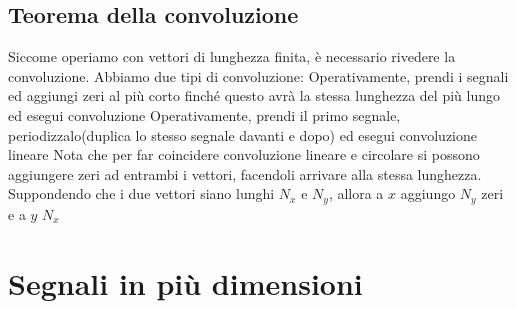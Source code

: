 \subsection{Teorema della convoluzione}
Siccome operiamo con vettori di lunghezza finita, è necessario rivedere la convoluzione. Abbiamo due tipi di convoluzione:
Operativamente, prendi i segnali ed aggiungi zeri al più corto finché questo avrà la stessa lunghezza del più lungo ed esegui convoluzione
Operativamente, prendi il primo segnale, periodizzalo(duplica lo stesso segnale davanti e dopo) ed esegui convoluzione lineare
Nota che per far coincidere convoluzione lineare e circolare si possono aggiungere zeri ad entrambi i vettori, facendoli arrivare alla stessa lunghezza.
\vskip3mm
Suppondendo che i due vettori siano lunghi $ N_x $ e $ N_y $, allora a $ x $ aggiungo $ N_y $ zeri e a $ y $ $ N_x $
\section{Segnali in più dimensioni}

